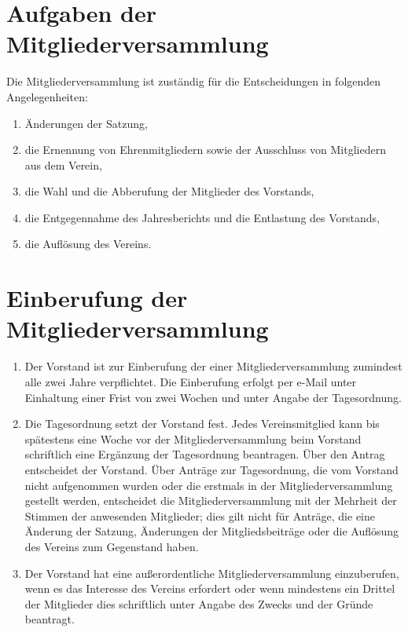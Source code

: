 \section{Aufgaben der Mitgliederversammlung}
Die Mitgliederversammlung ist zuständig für die Entscheidungen in folgenden
Angelegenheiten:
\begin{enumerate}[label=\alph*)]
    \item Änderungen der Satzung,
    \item die Ernennung von Ehrenmitgliedern sowie der Ausschluss von
        Mitgliedern aus dem Verein,
    \item die Wahl und die Abberufung der Mitglieder des Vorstands,
    \item die Entgegennahme des Jahresberichts und die Entlastung des Vorstands,
    \item die Auflösung des Vereins.
\end{enumerate}

\section{Einberufung der Mitgliederversammlung}
\begin{enumerate}[label=(\arabic*)]
    \item Der Vorstand ist zur Einberufung der einer Mitgliederversammlung
        zumindest alle zwei Jahre verpflichtet. Die Einberufung erfolgt
        per e-Mail unter Einhaltung einer Frist von zwei Wochen und unter
        Angabe der Tagesordnung.
    \item Die Tagesordnung setzt der Vorstand fest. Jedes Vereinsmitglied kann
        bis spätestens eine Woche vor der Mitgliederversammlung beim Vorstand
        schriftlich eine Ergänzung der Tagesordnung beantragen. Über den Antrag
        entscheidet der Vorstand. Über Anträge zur Tagesordnung, die vom
        Vorstand nicht aufgenommen wurden oder die erstmals in der
        Mitgliederversammlung gestellt werden, entscheidet die
        Mitgliederversammlung mit der Mehrheit der Stimmen der anwesenden
        Mitglieder; dies gilt nicht für Anträge, die eine Änderung der Satzung,
        Änderungen der Mitgliedsbeiträge oder die Auflösung des Vereins zum
        Gegenstand haben.
    \item Der Vorstand hat eine außerordentliche Mitgliederversammlung
        einzuberufen, wenn es das Interesse des Vereins erfordert oder wenn
        mindestens ein Drittel der Mitglieder dies schriftlich unter Angabe des
        Zwecks und der Gründe beantragt.
\end{enumerate}

